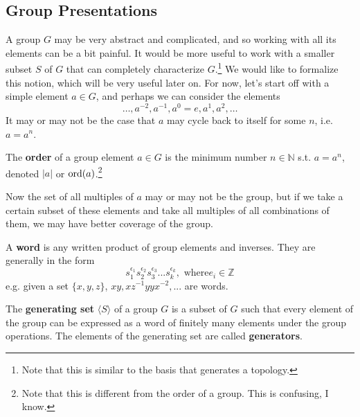 \subsection{Group Presentations} 

  A group $G$ may be very abstract and complicated, and so working with all its elements can be a bit painful. It would be more useful to work with a smaller subset $S$ of $G$ that can completely characterize $G$.\footnote{Note that this is similar to the basis that generates a topology.} We would like to formalize this notion, which will be very useful later on. For now, let's start off with a simple element $a \in G$, and perhaps we can consider the elements 
  \begin{equation}
    \ldots, a^{-2}, a^{-1}, a^0 = e, a^1, a^2, \ldots
  \end{equation}
  It may or may not be the case that $a$ may cycle back to itself for some $n$, i.e. $a = a^n$. 

  \begin{definition}
    The \textbf{order} of a group element $a \in G$ is the minimum number $n \in \mathbb{N}$ s.t. $a = a^n$, denoted $|a|$ or $\ord(a)$.\footnote{Note that this is different from the order of a group. This is confusing, I know. }
  \end{definition} 

  Now the set of all multiples of $a$ may or may not be the group, but if we take a certain subset of these elements and take all multiples of all combinations of them, we may have better coverage of the group. 

  \begin{definition}[Word]
    A \textbf{word} is any written product of group elements and inverses. They are generally in the form
    \begin{equation}
      s_{1}^{\epsilon_{1}} s_{2}^{\epsilon_{2}} s_{3}^{\epsilon_{3}}... s_{k}^{\epsilon_{k}}, \text{ where} e_i \in \mathbb{Z}
    \end{equation} 
    e.g. given a set $\{x,y,z\}$, $x y, x z^{-1} y y x^{-2},...$ are words. 
  \end{definition}

  \begin{definition}
    The \textbf{generating set} $\langle S \rangle$ of a group $G$ is a subset of $G$ such that every element of the group can be expressed as a word of finitely many elements under the group operations. The elements of the generating set are called \textbf{generators}.
  \end{definition}

